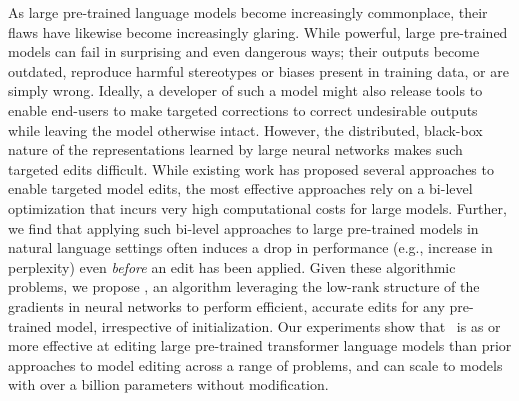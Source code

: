 As large pre-trained language models become increasingly commonplace, their flaws have likewise become increasingly glaring.
    While powerful, large pre-trained models can fail in surprising and even dangerous ways; their outputs become outdated, reproduce harmful stereotypes or biases present in training data,
    or are simply wrong.
    Ideally, a developer of such a model might also release tools to enable end-users to make targeted corrections
    to correct undesirable outputs while leaving the model otherwise intact. However, the distributed, black-box nature of the representations learned by large neural networks makes such targeted edits difficult. While existing work has proposed several approaches to enable targeted model edits, the most effective approaches rely on a bi-level optimization that incurs very high computational costs for large models. 
    Further, we find that applying such bi-level approaches to large pre-trained models in natural language settings often induces a drop in performance (e.g., increase in perplexity) even \textit{before} an edit has been applied. Given these algorithmic problems, we propose \name, an algorithm leveraging the low-rank structure of the gradients in neural networks to perform efficient, accurate edits for any pre-trained model, irrespective of initialization.
    Our experiments show that \sname~is as or more effective at editing large pre-trained transformer language models than prior approaches to model editing across a range of problems, and can scale to models with over a billion parameters without modification.